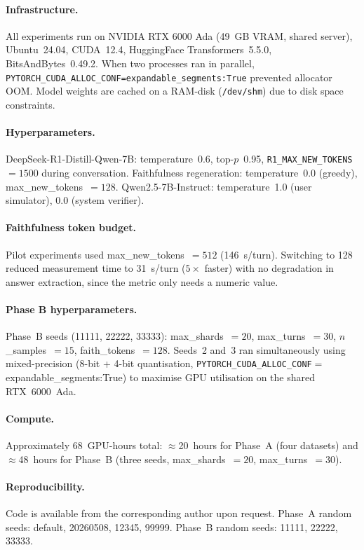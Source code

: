 \documentclass{article}
\begin{document}
\paragraph{Infrastructure.}
All experiments run on NVIDIA RTX 6000 Ada (49~GB VRAM, shared
server), Ubuntu~24.04, CUDA~12.4, HuggingFace Transformers~5.5.0,
BitsAndBytes~0.49.2.
When two processes ran in parallel,
\texttt{PYTORCH\_CUDA\_ALLOC\_CONF=expandable\_segments:True}
prevented allocator OOM.
Model weights are cached on a RAM-disk (\texttt{/dev/shm}) due to
disk space constraints.

\paragraph{Hyperparameters.}
DeepSeek-R1-Distill-Qwen-7B: temperature~0.6, top-$p$~0.95,
\texttt{R1\_MAX\_NEW\_TOKENS}~$=1500$ during conversation.
Faithfulness regeneration: temperature~0.0 (greedy),
max\_new\_tokens~$=128$.
Qwen2.5-7B-Instruct: temperature~1.0 (user simulator),
0.0 (system verifier).

\paragraph{Faithfulness token budget.}
Pilot experiments used max\_new\_tokens~$=512$ (146~s/turn).
Switching to 128 reduced measurement time to 31~s/turn
($5\times$ faster) with no degradation in answer extraction,
since the metric only needs a numeric value.

\paragraph{Phase B hyperparameters.}
Phase~B seeds (11111, 22222, 33333): max\_shards~$=20$,
max\_turns~$=30$, $n$\_samples~$=15$, faith\_tokens~$=128$.
Seeds~2 and~3 ran simultaneously using mixed-precision
(8-bit + 4-bit quantisation, \texttt{PYTORCH\_CUDA\_ALLOC\_CONF}$=$%
expandable\_segments:True) to maximise GPU utilisation on the
shared RTX~6000~Ada.

\paragraph{Compute.}
Approximately 68~GPU-hours total: $\approx$20~hours for Phase~A
(four datasets) and $\approx$48~hours for Phase~B (three seeds,
max\_shards~$=20$, max\_turns~$=30$).

\paragraph{Reproducibility.}
Code is available from the corresponding author upon request.
Phase~A random seeds: default, 20260508, 12345, 99999.
Phase~B random seeds: 11111, 22222, 33333.
\end{document}
